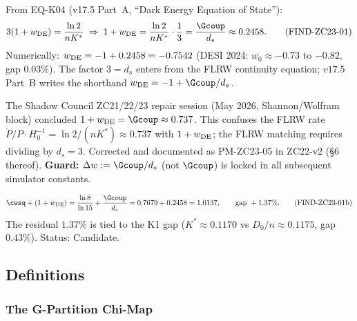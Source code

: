 \documentclass[12pt, a4paper]{article}
\begin{document}
\begin{keybox}[title={FIND-ZC23-01: $1+w_{\rm DE} = \Gcoup/d_s$ (Confirmed)}]
\label{zc23:find:wde}
From EQ-K04 (v17.5 Part~A, ``Dark Energy Equation of State''):
\[
  3(1+w_{\rm DE}) = \frac{\ln 2}{n K^*}
  \;\Rightarrow\;
  1 + w_{\rm DE} = \frac{\ln 2}{n K^*} \cdot \frac{1}{3}
  = \frac{\Gcoup}{d_s} \approx 0.2458.
  \tag{FIND-ZC23-01}
\]
Numerically: $w_{\rm DE} = -1 + 0.2458 = -0.7542$
(DESI 2024: $w_0\approx-0.73$ to $-0.82$, gap $0.03\%$).
The factor $3 = d_s$ enters from the FLRW continuity equation;
$v17.5$ Part~B writes the shorthand $w_{\rm DE} = -1 + \Gcoup/d_s$.
\end{keybox}

\begin{formalbox}[title={PM-ZC23-05 (Scar Tissue): Shadow Council Misreading}]
\label{zc23:pm:zc23-05}
The Shadow Council ZC21/22/23 repair session (May 2026, Shannon/Wolfram block)
concluded $1+w_{\rm DE} = \Gcoup \approx 0.737$.
This confuses the FLRW rate $\dot{P}/P\cdot H_0^{-1} = \ln2/(nK^*)\approx 0.737$
with $1+w_{\rm DE}$; the FLRW matching requires dividing by $d_s = 3$.
Corrected and documented as PM-ZC23-05 in ZC22-v2 (\S 6 thereof).
\textbf{Guard:} $\Delta w := \Gcoup/d_s$ (not $\Gcoup$) is locked in all
subsequent simulator constants.
\end{formalbox}

\begin{derivedbox}[title={FIND-ZC23-01b: Complementarity (Candidate)}]
\label{zc23:find:comp}
\begin{equation}
  \cwsq + (1+w_{\rm DE})
  = \frac{\ln 8}{\ln 15} + \frac{\Gcoup}{d_s}
  = 0.7679 + 0.2458
  = 1.0137,
  \qquad\text{gap }+1.37\%.
  \tag{FIND-ZC23-01b}
\end{equation}
The residual $1.37\%$ is tied to the K1 gap ($K^* \approx 0.1170$ vs
$D_0/n \approx 0.1175$, gap $0.43\%$).
Status: Candidate.
\end{derivedbox}

\subsection{Definitions}
\label{zc23:sec:defs}

\subsubsection{The G-Partition Chi-Map}
\end{document}
